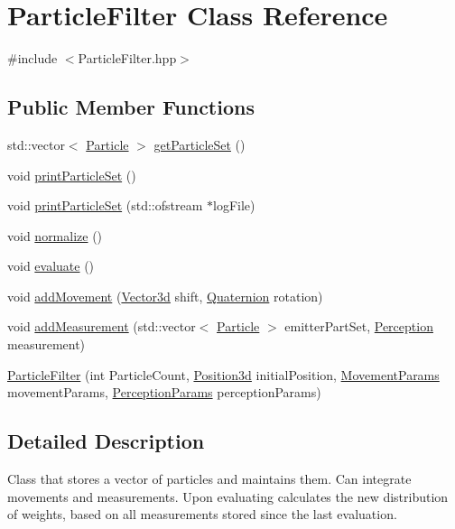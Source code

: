 \hypertarget{classParticleFilter}{}\section{Particle\+Filter Class Reference}
\label{classParticleFilter}


{\ttfamily \#include $<$Particle\+Filter.\+hpp$>$}

\subsection*{Public Member Functions}
\begin{DoxyCompactItemize}
\item 
std\+::vector$<$ \hyperlink{classParticle}{Particle} $>$ \hyperlink{classParticleFilter_af7340c9e67bf47622d45f26f85e3deeb}{get\+Particle\+Set} ()
\item 
void \hyperlink{classParticleFilter_a84c6ed2f699b9ec2572092ac1d473684}{print\+Particle\+Set} ()
\item 
void \hyperlink{classParticleFilter_a11f0ce13b31de989935d099ecd264e0f}{print\+Particle\+Set} (std\+::ofstream $\ast$log\+File)
\item 
void \hyperlink{classParticleFilter_aa689bbd14f073aeb1f1a9ef235afcade}{normalize} ()
\item 
void \hyperlink{classParticleFilter_a7cbb0bc65397e8a5a39d5ec23909e94d}{evaluate} ()
\item 
void \hyperlink{classParticleFilter_a88095fc284f68875a7c695503c0198ce}{add\+Movement} (\hyperlink{structVector3d}{Vector3d} shift, \hyperlink{structQuaternion}{Quaternion} rotation)
\item 
void \hyperlink{classParticleFilter_a40e29850234965f90555b9c21d29231f}{add\+Measurement} (std\+::vector$<$ \hyperlink{classParticle}{Particle} $>$ emitter\+Part\+Set, \hyperlink{structPerception}{Perception} measurement)
\item 
\hyperlink{classParticleFilter_ae4ef25720c55e31e3fef38b0323b10e8}{Particle\+Filter} (int Particle\+Count, \hyperlink{classPosition3d}{Position3d} initial\+Position, \hyperlink{structMovementParams}{Movement\+Params} movement\+Params, \hyperlink{structPerceptionParams}{Perception\+Params} perception\+Params)
\end{DoxyCompactItemize}


\subsection{Detailed Description}
Class that stores a vector of particles and maintains them. Can integrate movements and measurements. Upon evaluating calculates the new distribution of weights, based on all measurements stored since the last evaluation. 

